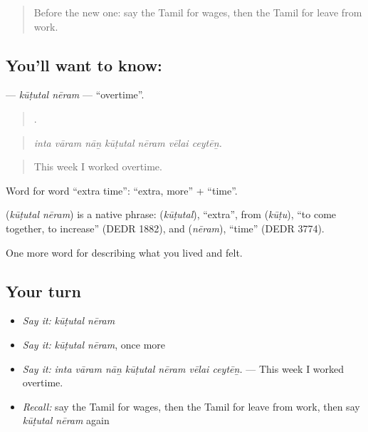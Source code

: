 \label{lesson:TA-C508-kututal-neram}



\begin{quote}
Before the new one: say the Tamil for wages, then the Tamil for leave from work.
\end{quote}

\subsection*{You'll want to know:  }
\textbf{ } — \emph{kūṭutal nēram} — \textquotedblleft{}overtime\textquotedblright{}.

\begin{quote}
      .
\end{quote}

\begin{quote}
\emph{inta vāram nāṉ kūṭutal nēram vēlai ceytēṉ.}
\end{quote}

\begin{quote}
This week I worked overtime.
\end{quote}

Word for word \textquotedblleft{}extra time\textquotedblright{}:  \textquotedblleft{}extra, more\textquotedblright{} +  \textquotedblleft{}time\textquotedblright{}.

\begin{cousinweb}
\textbf{ } (\emph{kūṭutal nēram}) is a native phrase:  (\emph{kūṭutal}), \textquotedblleft{}extra\textquotedblright{}, from  (\emph{kūṭu}), \textquotedblleft{}to come together, to increase\textquotedblright{} (DEDR 1882), and  (\emph{nēram}), \textquotedblleft{}time\textquotedblright{} (DEDR 3774).
\end{cousinweb}

\begin{grammarlens}[title={What you've built}]
One more word for describing what you lived and felt.
\end{grammarlens}

\subsection*{Your turn}
\begin{itemize}
\raggedright
  \item \emph{Say it:} \emph{kūṭutal nēram}
  \item \emph{Say it:} \emph{kūṭutal nēram}, once more
  \item \emph{Say it:} \emph{inta vāram nāṉ kūṭutal nēram vēlai ceytēṉ.} — This week I worked overtime.
  \item \emph{Recall:} say the Tamil for wages, then the Tamil for leave from work, then say \emph{kūṭutal nēram} again
\end{itemize}

